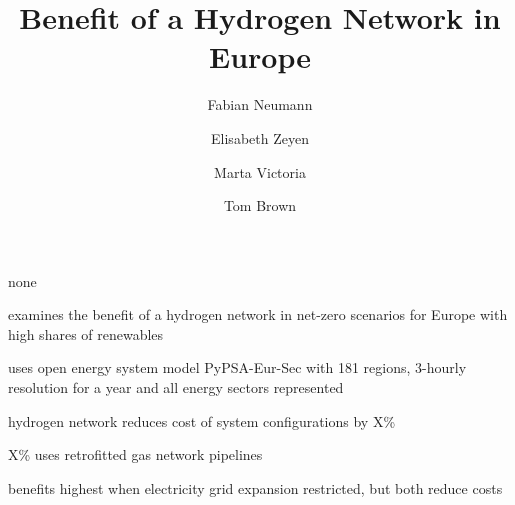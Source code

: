 \documentclass[11pt,1p]{elsarticle}
\begin{document}
\begin{frontmatter}

	\title{Benefit of a Hydrogen Network in Europe}

	\author[tubaddress]{Fabian Neumann}
	\author[tubaddress]{Elisabeth Zeyen}
	\author[aarhus,aarhus2]{Marta Victoria}
	\author[tubaddress]{Tom Brown}
	\address[tubaddress]{Department of Digital Transformation in Energy Systems, Institute of Energy Technology, Technische Universität Berlin, Fakultät III, Einsteinufer 25 (TA 8), 10587 Berlin, Germany}
	\address[aarhus]{Department of Mechanical and Production Engineering, Aarhus University, Inge Lehmanns Gade 10, 8000 Aarhus, Denmark}
	\address[aarhus2]{iCLIMATE Interdisciplinary Centre for Climate Change, Aarhus University}

	\begin{abstract}
		
	\end{abstract}

	\begin{keyword}
		none
	\end{keyword}

	\begin{graphicalabstract}
	\end{graphicalabstract}

	\begin{highlights}
		\item examines the benefit of a hydrogen network in net-zero scenarios for Europe with high shares of renewables
		\item uses open energy system model PyPSA-Eur-Sec with 181 regions, 3-hourly resolution for a year and all energy sectors represented
		\item hydrogen network reduces cost of system configurations by X\%
		\item X\% uses retrofitted gas network pipelines
		\item benefits highest when electricity grid expansion restricted, but both reduce costs
	\end{highlights}

\end{frontmatter}

\listoftodos[TODOs]

\begin{small}
	\tableofcontents
\end{small}
~\\
\end{document}
